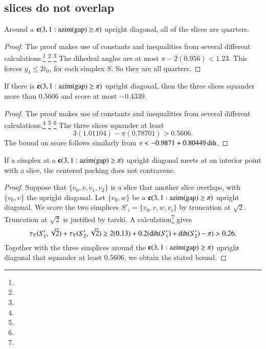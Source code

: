 
\subsection{slices do not overlap} %




\begin{lemma}\label{lemma:slice-quarter}
Around a ${\operatorname{\bf c}}{(3,1: {\operatorname{azim}}({\operatorname{gap}}) \ge \pi)}$ upright diagonal, all of the slices
are quarters.
\end{lemma}

\begin{proof}  The proof makes use of constants and inequalities from
several different calculations.\footnote{} %
\footnote{} %
\footnote{} %
The dihedral angles are at most $\pi-
2(0.956) < 1.23$. This forces $y_4\le 2t_0$, for each simplex $S$.
So they are all quarters.
\end{proof}

\begin{lemma}\label{lemma:3-crowded}
If there is ${\operatorname{\bf c}}{(3,1: {\operatorname{azim}}({\operatorname{gap}}) \ge \pi)}$ upright diagonal, then the three 
slices squander more than $0.5606$ and score at most $-0.4339$.
\end{lemma}


\begin{proof}  The proof makes use of constants and inequalities from
several different calculations.\footnote{} %
\footnote{} %
\footnote{} %
The three slices squander at
least
    $$
    3 (1.01104) - \pi (0.78701) > 0.5606.
    $$
The bound on score follows similarly from $\nu<-0.9871+0.80449\operatorname{dih}$.
\end{proof}

\begin{lemma}
If a simplex at a ${\operatorname{\bf c}}{(3,1: {\operatorname{azim}}({\operatorname{gap}}) \ge \pi)}$ upright diagonal meets at an
interior point with a slice, the centered packing does
not contravene.
\end{lemma}

\begin{proof}
Suppose that $\{v_0,v,v_1,v_2\}$ is a slice that another
slice overlaps, with $\{v_0,v\}$ the upright diagonal.  Let
$\{v_0,w\}$ be a ${\operatorname{\bf c}}{(3,1: {\operatorname{azim}}({\operatorname{gap}}) \ge \pi)}$ upright diagonal. We score the two
simplices $S'_i = \{v_0,v,w,v_i\}$ by truncation at $\sqrt{2}$.
Truncation at $\sqrt{2}$ is justified by tarski.
A calculation\footnote{} %
gives
    $$\tau_V(S'_1,\sqrt{2})+\tau_V(S'_2,\sqrt{2})\ge 2(0.13) +
        0.2(\operatorname{dih}(S'_1)+\operatorname{dih}(S'_2)-\pi) > 0.26.
    $$
Together with the three simplices around the ${\operatorname{\bf c}}{(3,1: {\operatorname{azim}}({\operatorname{gap}}) \ge \pi)}$ upright
diagonal that squander at least $0.5606$, we obtain the stated
bound.
\end{proof}

